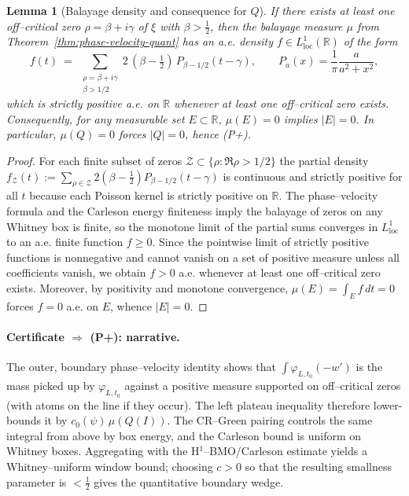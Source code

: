 \documentclass[11pt]{article}
\newtheorem{lemma}[theorem]{Lemma}
\theoremstyle{definition}
\theoremstyle{remark}
\newcommand{\R}{\mathbb{R}}
\begin{document}
\begin{lemma}[Balayage density and consequence for $Q$]\label{lem:balayage-density}
If there exists at least one off--critical zero $\rho=\beta+i\gamma$ of $\xi$ with $\beta>\tfrac12$, then the balayage measure $\mu$ from Theorem~\ref{thm:phase-velocity-quant} has an a.e. density $f\in L^1_{\mathrm{loc}}(\mathbb R)$ of the form
\[
  f(t)\ =\ \sum_{\substack{\rho=\beta+i\gamma\\ \beta>1/2}} 2\,(\beta-\tfrac12)\,P_{\beta-1/2}(t-\gamma),\qquad P_a(x)=\frac{1}{\pi}\frac{a}{a^2+x^2},
\]
which is strictly positive a.e. on $\R$ whenever at least one off--critical zero exists. Consequently, for any measurable set $E\subset\R$, $\mu(E)=0$ implies $|E|=0$. In particular, $\mu(Q)=0$ forces $|Q|=0$, hence \textup{(P+)}.
\end{lemma}
\begin{proof}
For each finite subset of zeros $\mathcal Z\subset\{\rho:\Re\rho>1/2\}$ the partial density
\(f_{\mathcal Z}(t):=\sum_{\rho\in\mathcal Z}2(\beta-\tfrac12)P_{\beta-1/2}(t-\gamma)\)
is continuous and strictly positive for all $t$ because each Poisson kernel is strictly positive on $\R$.
The phase--velocity formula and the Carleson energy finiteness imply the balayage of zeros on any Whitney box is finite, so the monotone limit of the partial sums converges in $L^1_{\mathrm{loc}}$ to an a.e. finite function $f\ge0$. Since the pointwise limit of strictly positive functions is nonnegative and cannot vanish on a set of positive measure unless all coefficients vanish, we obtain $f>0$ a.e. whenever at least one off--critical zero exists. Moreover, by positivity and monotone convergence, $\mu(E)=\int_E f\,dt=0$ forces $f=0$ a.e. on $E$, whence $|E|=0$.
\end{proof}

\paragraph{Certificate $\Rightarrow$ (P+): narrative.}
The outer, boundary phase–velocity identity shows that $\int\varphi_{L,t_0}(-w')$ is the mass picked up by $\varphi_{L,t_0}$ against a positive measure supported on off–critical zeros (with atoms on the line if they occur). The left plateau inequality therefore lower-bounds it by $c_0(\psi)\,\mu(Q(I))$. The CR–Green pairing controls the same integral from above by box energy, and the Carleson bound is uniform on Whitney boxes. Aggregating with the H$^1$–BMO/Carleson estimate yields a Whitney–uniform window bound; choosing $c>0$ so that the resulting smallness parameter is $<\tfrac12$ gives the quantitative boundary wedge.
\end{document}
